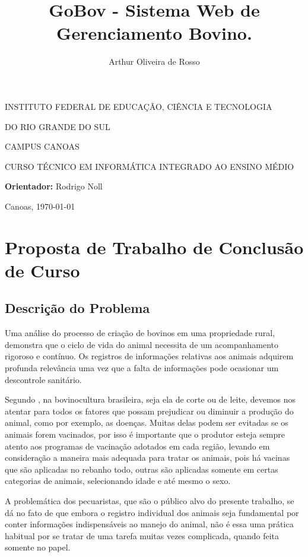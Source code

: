 \documentclass[12pt]{article}
\author{Arthur Oliveira de Rosso}
\title{GoBov - Sistema Web de Gerenciamento Bovino.}
\begin{document}
{\textual}
\makeatletter
\begin{titlepage}
\begin{center}

INSTITUTO FEDERAL DE EDUCAÇÃO, CIÊNCIA E TECNOLOGIA 

DO RIO GRANDE DO SUL

CAMPUS CANOAS

CURSO TÉCNICO EM INFORMÁTICA INTEGRADO AO ENSINO MÉDIO

\vfill
\vfill

\@author

\vfill

\textbf{\@title}

\vfill

\textbf{Orientador:} Rodrigo Noll

\vfill

Canoas, \today

\end{center}
\newpage


\section{Proposta de Trabalho de Conclusão de Curso}

\subsection{Descrição do Problema}
Uma análise do processo de criação de bovinos em uma propriedade rural, demonstra que o ciclo de vida do animal necessita de um acompanhamento rigoroso e contínuo. Os registros de informações relativas aos animais adquirem profunda relevância uma vez que a falta de informações pode ocasionar um descontrole sanitário.

Segundo , na bovinocultura brasileira, seja ela de corte ou de leite, devemos nos atentar para todos os fatores que possam prejudicar ou diminuir a produção do animal, como por exemplo, as doenças. Muitas  delas podem ser evitadas se os animais forem vacinados, por isso é importante que o produtor esteja sempre atento aos programas de vacinação adotados em cada região, levando em consideração a maneira mais adequada para tratar os animais, pois há vacinas que são aplicadas no rebanho todo, outras são aplicadas somente em certas categorias de animais, selecionando idade e até mesmo o sexo.

A problemática dos pecuaristas, que são o público alvo do presente trabalho, se dá no fato de que embora o registro individual dos animais seja fundamental por conter informações indispensáveis ao manejo do animal, não é essa uma prática habitual por se tratar de uma tarefa muitas vezes complicada, quando feita somente no papel.




\end{titlepage}
\end{document}
